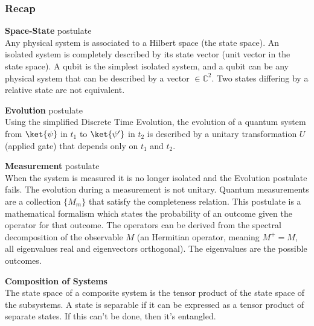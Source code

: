 \documentclass[10pt]{report}
\begin{document}
\subsubsection{Recap}
\begin{list}{}{}
	\item \textbf{Space-State} postulate\\
	Any physical system is associated to a Hilbert space (the state space). An isolated system is completely described by its state vector (unit vector in the state space). A qubit is the simplest isolated system, and a qubit can be any physical system that can be described by a vector $\in \mathbb{C}^2$. Two states differing by a relative state are not equivalent.
	\item \textbf{Evolution} postulate\\
	Using the simplified Discrete Time Evolution, the evolution of a quantum system from $\ket{\psi}$ in $t_1$ to $\ket{\psi'}$ in $t_2$ is described by a unitary transformation $U$ (applied gate) that depends only on $t_1$ and $t_2$.
	\item \textbf{Measurement} postulate\\
	When the system is measured it is no longer isolated and the Evolution postulate fails. The evolution during a measurement is not unitary. Quantum measurements are a collection $\{M_m\}$ that satisfy the completeness relation. This postulate is a mathematical formalism which states the probability of an outcome given the operator for that outcome. The operators can be derived from the spectral decomposition of the observable $M$ (an Hermitian operator, meaning $M^+=M$, all eigenvalues real and eigenvectors orthogonal). The eigenvalues are the possible outcomes.
	\item \textbf{Composition of Systems}\\
	The state space of a composite system is the tensor product of the state space of the subsystems. A state is separable if it can be expressed as a tensor product of separate states. If this can't be done, then it's entangled.
\end{list}
\end{document}
